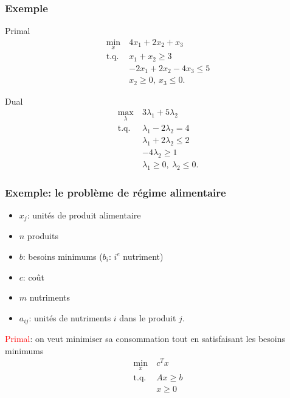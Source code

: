 \documentclass[usepdftitle=false]{beamer}
\begin{document}
\begin{frame}
	\frametitle{Exemple}
	
	Primal
	\begin{align*}
		\min_x\ & 4x_1 + 2x_2 + x_3 \\
		\text{t.q. } & x_1 + x_2 \geq 3 \\
		& -2x_1 + 2x_2 -4 x_3 \leq 5 \\
		& x_2 \geq 0,\ x_3 \leq 0.
	\end{align*}
	
	Dual
	\begin{align*}
		\max_{\lambda}\ & 3\lambda_1 + 5\lambda_2 \\
		\text{t.q. } & \lambda_1 -2\lambda_2 = 4 \\
		& \lambda_1 +2\lambda_2 \leq 2 \\
		& -4\lambda_2 \geq 1 \\
		& \lambda_1 \geq 0,\ \lambda_2 \leq 0.
	\end{align*}
	
\end{frame}

\begin{frame}
\frametitle{Exemple: le problème de régime alimentaire}

\begin{itemize}
\item
$x_j$: unités de produit alimentaire
\item
$n$ produits
\item
$b$: besoins minimums ($b_i$: $i^e$ nutriment)
\item
$c$: coût
\item
$m$ nutriments
\item
$a_{ij}$: unités de nutriments $i$ dans le produit $j$.
\end{itemize}

\textcolor{red}{Primal}: on veut minimiser sa consommation tout en satisfaisant les besoins minimums
\begin{align*}
\min_x \ & c^T x \\
\mbox{t.q. } & Ax \geq b \\
& x \geq 0
\end{align*}

\end{frame}
\end{document}
